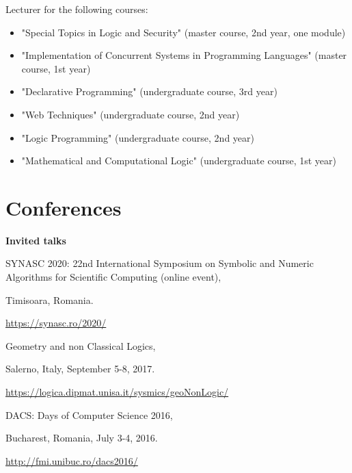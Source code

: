\documentclass[11pt]{article}
\begin{document}
\noindent
[2009 - present] Lecturer for the following  courses:
\begin{itemize}
 \vspace{-.3cm}
    \item "Special Topics in Logic and Security" (master course, 2nd year, one module)
 \vspace{-.3cm}
    \item "Implementation of Concurrent Systems in Programming Languages" (master course, 1st year)
\vspace{-.3cm}
    \item "Declarative Programming" (undergraduate course, 3rd year)
 
    \vspace{-.3cm}
    \item "Web Techniques" (undergraduate course, 2nd year)
      
  \vspace{-.3cm}
    \item "Logic Programming" (undergraduate course, 2nd year)
    \vspace{-.3cm}
    \item "Mathematical and Computational Logic" (undergraduate course, 1st year)
\end{itemize}


\section*{Conferences}
\vspace{0.3cm}
\noindent
{\large \textbf{Invited talks}}
\medskip

\noindent [T11] SYNASC 2020: 22nd International Symposium on Symbolic and Numeric Algorithms for Scientific
Computing (online event), 

Timisoara, Romania.

\url{https://synasc.ro/2020/}

\noindent [T10] Geometry and non Classical Logics, 

Salerno, Italy, September 5-8, 2017. 

\url{https://logica.dipmat.unisa.it/sysmics/geoNonLogic/}

\noindent [T9] DACS: Days of Computer Science 2016, 

Bucharest, Romania, July 3-4, 2016.

\url{http://fmi.unibuc.ro/dacs2016/}
\end{document}
